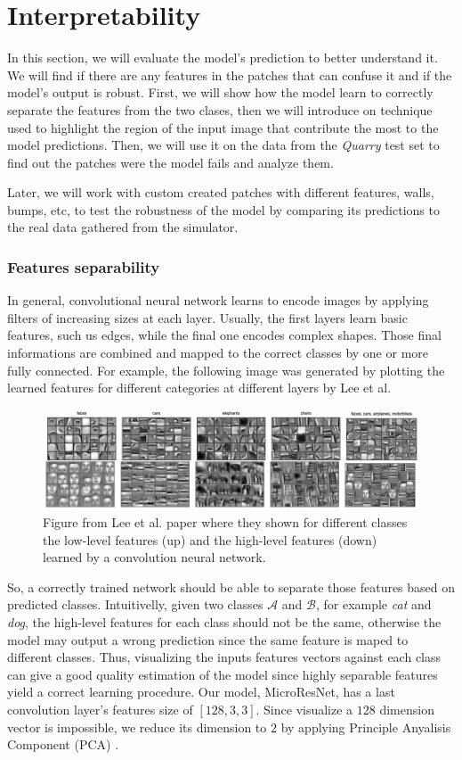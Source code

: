 \documentclass[../document.tex]{subfiles}
\begin{document}
\chapter{Interpretability}
\label{chap: interpretability}
In this section, we will evaluate the model's prediction to better understand it. We will find if there are any features in the patches that can confuse it and if the model's output is robust.
First, we will show how the model learn to correctly separate the features from the two clases, then we will introduce on technique used to highlight the region of the input image that contribute the most to the model predictions. Then, we will use it on the data from the \emph{Quarry} test set to find out the patches were the model fails and analyze them.

Later, we will work with custom created patches with different features, walls, bumps, etc, to test the robustness of the model by comparing its predictions to the real data gathered from the simulator.


\subsection{Features separability}
In general, convolutional neural network learns to encode images by applying filters of increasing sizes at each layer. Usually, the first layers learn basic features, such us edges, while the final one encodes complex shapes. Those final informations are combined and mapped to the correct classes by one or more fully connected. For example, the following image was generated by plotting the learned features for different categories at different layers by 
Lee et al. \cite{deepbelief}
\begin{figure}[H]
    \centering
    \includegraphics[width=\linewidth]{../img/5/deep_belief.png}
    \caption{Figure from Lee et al. \cite{deepbelief} paper where they shown for different classes the low-level features (up) and the high-level features (down) learned by a convolution neural network.}
\end{figure}
So, a correctly trained network should be able to separate those features based on predicted classes. Intuitivelly, given two classes $\mathcal{A}$ and $\mathcal{B}$, for example \emph{cat} and \emph{dog}, the high-level features for each class should not be the same, otherwise the model may output a wrong prediction since the same feature is maped to different classes. 
Thus, visualizing the inputs features vectors against each class can give a good quality estimation of the model since highly separable features yield a correct learning procedure.  Our model, MicroResNet, has a last convolution layer's features size of $[128, 3, 3 ]$. Since visualize a $128$ dimension vector is impossible, we reduce its dimension to $2$ by applying Principle Anyalisis Component (PCA) \cite{pca}. 
\end{document}

